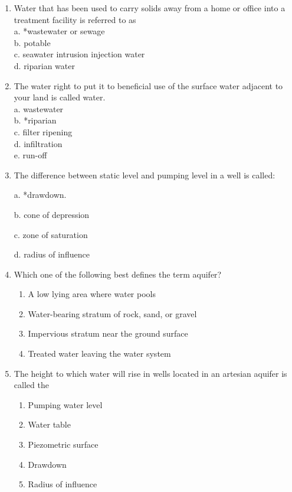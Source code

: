\begin{enumerate}
  \item Water that has been used to carry solids away from a home or office into a treatment facility is referred to as\\
a. *wastewater or sewage\\
b. potable\\
c. seawater intrusion injection water\\
d. riparian water\\

  \item The water right to put it to beneficial use of the surface water adjacent to your land is called water.\\
a. wastewater\\
b. *riparian\\
c. filter ripening\\
d. infiltration\\
e. run-off\\

  \item The difference between static level and pumping level in a well is called:

a. *drawdown.

b. cone of depression

c. zone of saturation

d. radius of influence

\item Which one of the following best defines the term aquifer?\\
\begin{enumerate}
\item A low lying area where water pools
\item Water-bearing stratum of rock, sand, or gravel
\item Impervious stratum near the ground surface
\item Treated water leaving the water system
\end{enumerate}

\item The height to which water will rise in wells located in an artesian aquifer is called the
\begin{enumerate}
\item Pumping water level
\item Water table
\item Piezometric surface
\item Drawdown
\item Radius of influence
\end{enumerate}


\end{enumerate}
